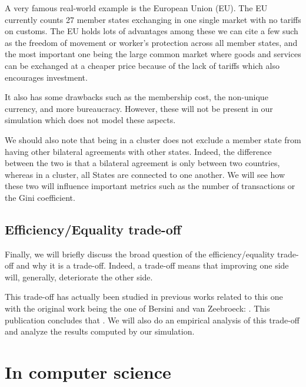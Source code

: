     A very famous real-world example is the European Union (EU). The EU currently counts 27 member states exchanging in one single market with no tariffs on customs. The EU holds lots of advantages among these we can cite a few such as the freedom of movement or worker's protection across all member states, and the most important one being the large common market where goods and services can be exchanged at a cheaper price because of the lack of tariffs which also encourages investment.
    
    It also has some drawbacks such as the membership cost, the non-unique currency, and more bureaucracy. However, these will not be present in our simulation which does not model these aspects.
    
    We should also note that being in a cluster does not exclude a member state from having other bilateral agreements with other states. Indeed, the difference between the two is that a bilateral agreement is only between two countries, whereas in a cluster, all States are connected to one another. We will see how these two will influence important metrics such as the number of transactions or the Gini coefficient.

\subsection{Efficiency/Equality trade-off}
    Finally, we will briefly discuss the broad question of the efficiency/equality trade-off and why it is a trade-off. Indeed, a trade-off means that improving one side will, generally, deteriorate the other side.
    
    This trade-off has actually been studied in previous works related to this one with the original work being the one of Bersini and van Zeebroeck: . This publication concludes that  \cite{bersini}. We will also do an empirical analysis of this trade-off and analyze the results computed by our simulation.
    

\section{In computer science}